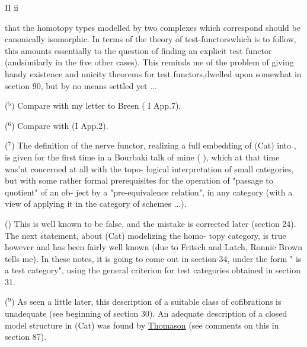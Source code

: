 II ii

that the homotopy types modelled by two complexes which correspond should
be canonically isomorphic. In terms of the theory of test-functorswhich
is to follow,  this amounts essentially to the question of finding an
explicit test functor \hand{$\Delta \to \widehat{\bigcirc}$} (and\hand{/}similarly in the five other cases).
This reminds me of the problem of giving handy existence and unicity
theorems for test functors,dwelled upon somewhat in section 90, but by
no means settled yet ...

($^5$)   Compare with my letter to Breen ( I App.7).

($^6$)   Compare with (I App.2).

($^7$)   The definition of the nerve functor,  realizing a full embedding
of (Cat) into \hand{$\Delta$}$\hat{}$, is given for the first time  in a Bourbaki talk of mine
 (            ),  which at that time was'nt concerned at all with the topo-%
logical interpretation of small categories,  but with  some rather
formal prerequisites for the operation of "passage to quotient" of an ob-%
ject by a "pre-equivalence relation",  in any category (with a view of
applying it  in the category of schemes ...).

()   This is well known to be false,  and the mistake is corrected
later (section 24).  The next statement,  about (Cat) modelizing the homo-%
topy category,  is true however and has been fairly well known  (due to
Fritsch and Latch, Ronnie Brown tells me).  In these notes,  it is going
to come out in section 34,  under the form "\hand{$\Delta$} is a test category",
using the general criterion for test categories obtained in section 31.

($^9$)   As seen a little later,  this  description of a suitable class of
cofibrations is unadequate (see  beginning of section 30).  An adequate
description of a closed model structure in (Cat) was found by \uline{Thomason}
(see comments on this in section 87).

